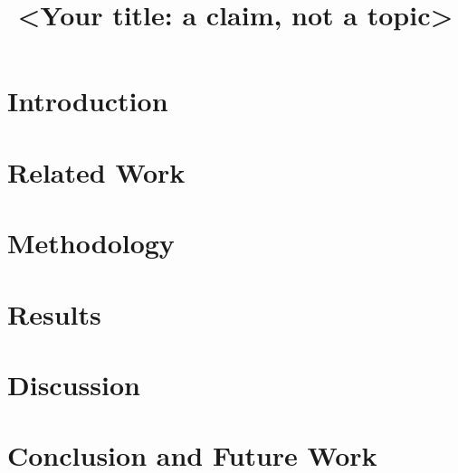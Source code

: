 \documentclass[manuscript,review,anonymous]{acmart}
\begin{document}
\title{<Your title: a claim, not a topic>}

\begin{abstract}
\end{abstract}

\maketitle

\section{Introduction}

\section{Related Work}

\section{Methodology}

\section{Results}

\section{Discussion}

\section{Conclusion and Future Work}

\end{document}
